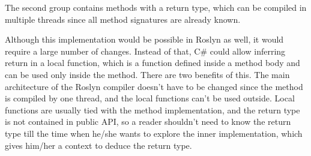The second group contains methods with a return type, which can be compiled in multiple threads since all method signatures are already known.
\par
Although this implementation would be possible in Roslyn as well, it would require a large number of changes. 
Instead of that, C\# could allow inferring return in a local function, which is a function defined inside a method body and can be used only inside the method. 
There are two benefits of this. 
The main architecture of the Roslyn compiler doesn’t have to be changed since the method is compiled by one thread, and the local functions can’t be used outside. 
Local functions are usually tied with the method implementation, and the return type is not contained in public API, so a reader shouldn’t need to know the return type till the time when he/she wants to explore the inner implementation, which gives him/her a context to deduce the return type.


